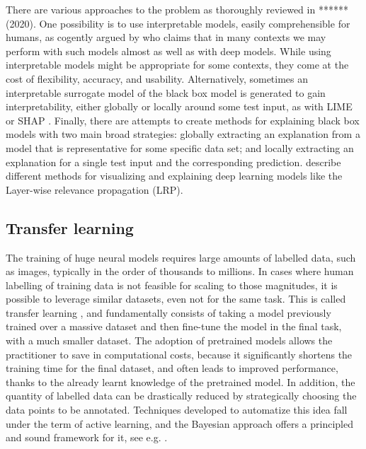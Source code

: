 There are various approaches to the problem as 
thoroughly reviewed in ****** (2020).
One possibility is to use interpretable models,
 easily comprehensible for humans,
as cogently argued by \cite{rudin2019stop} who claims 
that in many contexts we may perform with such models 
almost as well as with deep models.
 While using interpretable models might be appropriate for some
  contexts, they come at the cost of flexibility, accuracy, and usability.
  Alternatively, sometimes an interpretable surrogate model of the black box model is generated to gain interpretability, either globally or locally around
some test input, as with LIME \cite{ribeiro2016model} or SHAP \cite{lundberg2017unified}.
Finally, there are attempts to create methods for explaining 
black box models with two main broad strategies: globally
extracting an explanation from a model that is representative for some specific
data set; and locally extracting an explanation for a single test input 
 and the corresponding prediction.
  \cite{samek2017explainable} describe different methods for visualizing and explaining deep learning models like the Layer-wise relevance propagation (LRP). 
 
 
\subsection{Transfer learning}\label{sec:transfer}

The training of huge neural models requires large amounts of labelled data, such as images, typically in the order of thousands to millions. In cases where human labelling of training data is not feasible 
for scaling to those magnitudes, it is possible to leverage similar datasets, even not for the same task. This is called transfer learning \cite{tan2018survey,pan2009survey}, and fundamentally consists of taking a model previously trained over a massive dataset and then fine-tune the model in the final task, with a much smaller dataset. The adoption of pretrained models allows the practitioner to save in computational costs, because it significantly shortens the training time for the final dataset, and often leads to improved performance, thanks to the already learnt knowledge of the pretrained model. In addition, the quantity of labelled data can be drastically reduced by strategically choosing the data points to be annotated. Techniques developed to automatize this idea fall under the term of active learning, and the Bayesian approach offers a principled and sound framework for it, see e.g. \cite{houlsby2011bayesian}.

